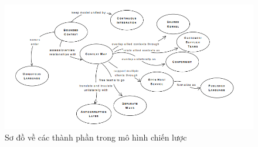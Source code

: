 \begin{figure}[H]

\centering

\includegraphics[scale = 0.9]{pictures/cac_mau_chien_luoc/temp.png}

\caption{Sơ đồ về các thành phần trong mô hình chiến lược}

\end{figure}











